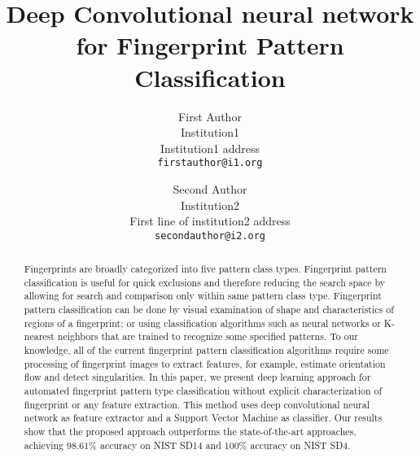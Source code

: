 \documentclass[10pt,twocolumn,letterpaper]{article}
\begin{document}
\title{Deep Convolutional neural network for Fingerprint Pattern Classification}

\author{First Author\\
Institution1\\
Institution1 address\\
{\tt\small firstauthor@i1.org}
\and
Second Author\\
Institution2\\
First line of institution2 address\\
{\tt\small secondauthor@i2.org}
}

\maketitle
\thispagestyle{empty}

\begin{abstract}
   Fingerprints are broadly categorized into five pattern class types.
   Fingerprint pattern classification is useful for quick exclusions and 
   therefore reducing the search space by allowing for search and 
   comparison only within same pattern class type.
   Fingerprint pattern classification can be done by visual examination of
   shape and characteristics of regions of a fingerprint; or using classification 
   algorithms such as neural networks or K-nearest neighbors that are trained 
   to recognize some specified patterns.  To our knowledge, all of the current 
   fingerprint pattern classification algorithms require some processing of 
   fingerprint images to extract features, for example, estimate orientation flow 
   and detect singularities.   In this paper, we present deep learning approach 
   for automated fingerprint pattern type classification without explicit characterization  
   of fingerprint or any feature extraction. 
   This method uses deep convolutional neural network as feature extractor and 
   a Support Vector Machine as classifier.  Our results show that the proposed 
   approach outperforms the state-of-the-art approaches, achieving $98.61\%$ accuracy 
   on NIST SD14 and $100\%$ accuracy on NIST SD4.
\end{abstract}

\end{document}
